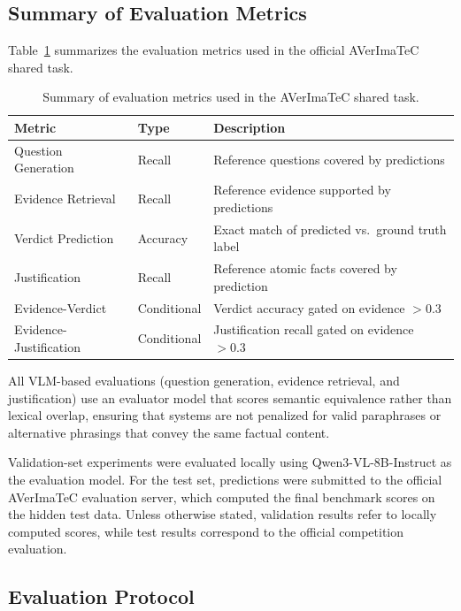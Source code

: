 \subsection{Summary of Evaluation Metrics}

Table~\ref{tab:eval_metrics} summarizes the evaluation metrics used in the official AVerImaTeC shared task.

\begin{table}[htbp]
\centering
\caption{Summary of evaluation metrics used in the AVerImaTeC shared task.}
\label{tab:eval_metrics}
\begin{tabular}{lll}
\hline
\textbf{Metric} & \textbf{Type} & \textbf{Description} \\
\hline
Question Generation & Recall & Reference questions covered by predictions \\
Evidence Retrieval & Recall & Reference evidence supported by predictions \\
Verdict Prediction & Accuracy & Exact match of predicted vs.\ ground truth label \\
Justification & Recall & Reference atomic facts covered by prediction \\
Evidence-Verdict & Conditional & Verdict accuracy gated on evidence $> 0.3$ \\
Evidence-Justification & Conditional & Justification recall gated on evidence $> 0.3$ \\
\hline
\end{tabular}
\end{table}

All VLM-based evaluations (question generation, evidence retrieval, and justification) use an evaluator model that scores semantic equivalence rather than lexical overlap, ensuring that systems are not penalized for valid paraphrases or alternative phrasings that convey the same factual content.

Validation-set experiments were evaluated locally using Qwen3-VL-8B-Instruct as the evaluation model. For the test set, predictions were submitted to the official AVerImaTeC evaluation server, which computed the final benchmark scores on the hidden test data. Unless otherwise stated, validation results refer to locally computed scores, while test results correspond to the official competition evaluation.

\subsection{Evaluation Protocol}

